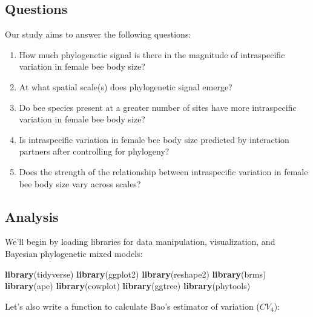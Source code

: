 \documentclass[
]{article}
\newenvironment{Shaded}{\begin{snugshade}}{\end{snugshade}}
\newcommand{\FunctionTok}[1]{\textcolor[rgb]{0.13,0.29,0.53}{\textbf{#1}}}
\newcommand{\NormalTok}[1]{#1}
\providecommand{\tightlist}{%
  \setlength{\itemsep}{0pt}\setlength{\parskip}{0pt}}
\begin{document}
\subsection{Questions}\label{questions}

Our study aims to answer the following questions:

\begin{enumerate}
\def\labelenumi{\arabic{enumi})}
\tightlist
\item
  How much phylogenetic signal is there in the magnitude of
  intraspecific variation in female bee body size?
\item
  At what spatial scale(s) does phylogenetic signal emerge?
\item
  Do bee species present at a greater number of sites have more
  intraspecific variation in female bee body size?
\item
  Is intraspecific variation in female bee body size predicted by
  interaction partners after controlling for phylogeny?
\item
  Does the strength of the relationship between intraspecific variation
  in female bee body size vary across scales?
\end{enumerate}

\subsection{Analysis}\label{analysis}

We'll begin by loading libraries for data manipulation, visualization,
and Bayesian phylogenetic mixed models:

\begin{Shaded}
\begin{Highlighting}[]
\FunctionTok{library}\NormalTok{(tidyverse)}
\FunctionTok{library}\NormalTok{(ggplot2)}
\FunctionTok{library}\NormalTok{(reshape2)}
\FunctionTok{library}\NormalTok{(brms)}
\FunctionTok{library}\NormalTok{(ape)}
\FunctionTok{library}\NormalTok{(cowplot)}
\FunctionTok{library}\NormalTok{(ggtree)}
\FunctionTok{library}\NormalTok{(phytools)}
\end{Highlighting}
\end{Shaded}

Let's also write a function to calculate Bao's estimator of variation
(\(CV_4\)):
\end{document}
